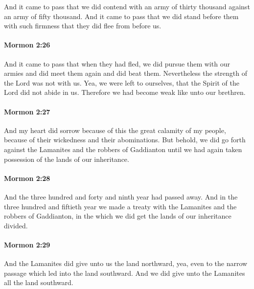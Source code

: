 			And it came to pass that we did contend with an army of thirty thousand
			against an army of fifty thousand.
			And it came to pass that we did stand before them with such firmness
			that they did flee from before us.

		\paragraph{Mormon 2:26} %
			\label{MORMON-2-26}

			And it came to pass that when they had fled,
			we did pursue them with our armies
			and did meet them again and did beat them.
			Nevertheless the strength of the Lord was not with us.
			Yea, we were left to ourselves,
			that the Spirit of the Lord did not abide in us.
			Therefore we had become weak like unto our brethren.

		\paragraph{Mormon 2:27} %
			\label{MORMON-2-27}

			And my heart did sorrow because of this the great calamity of my people,
			because of their wickedness and their abominations.
			But behold, we did go forth against the Lamanites and the robbers of Gaddianton
			until we had again taken possession of the lands of our inheritance.

		\paragraph{Mormon 2:28} %
			\label{MORMON-2-28}

			And the three hundred and forty and ninth year had passed away.
			And in the three hundred and fiftieth year
			we made a treaty with the Lamanites and the robbers of Gaddianton,
			in the which we did get the lands of our inheritance divided.

		\paragraph{Mormon 2:29} %
			\label{MORMON-2-29}

			And the Lamanites did give unto us the land northward,
			yea, even to the narrow passage which led into the land southward.
			And we did give unto the Lamanites all the land southward.


